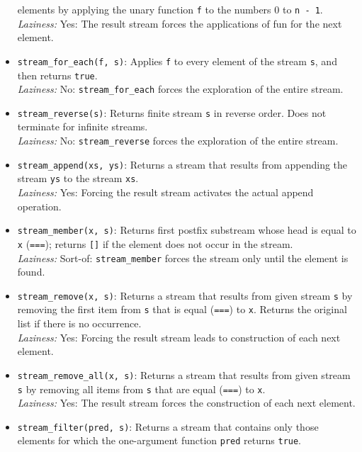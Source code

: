 \begin{itemize}
elements by applying the unary function \lstinline{f} to the numbers 0
to \lstinline{n - 1}.\\
\emph{Laziness:}  Yes: The result stream forces the applications of fun
            for the next element.
\item \lstinline{stream_for_each(f, s)}: Applies \lstinline{f} to every
  element of the stream \lstinline{s}, and then returns
  \lstinline{true}.\\
\emph{Laziness:}  No: \lstinline{stream_for_each} forces the exploration of the entire stream.
\item \lstinline{stream_reverse(s)}: Returns finite stream \lstinline{s} in reverse
  order. Does not terminate for infinite streams.\\
\emph{Laziness:}  No: \lstinline{stream_reverse} forces the exploration of the entire stream.
\item \lstinline{stream_append(xs, ys)}: Returns a stream that results from 
appending the stream \lstinline{ys} to the stream \lstinline{xs}.\\
\emph{Laziness:}  Yes: Forcing the result stream activates the actual append operation.
\item \lstinline{stream_member(x, s)}: Returns first postfix substream
whose head is equal to
\lstinline{x} (\lstinline{===}); returns \lstinline{[]} if the
element does not occur in the stream.\\
 \emph{Laziness:}  Sort-of: \lstinline{stream_member} forces the stream only until the element is found.
\item \lstinline{stream_remove(x, s)}: Returns a stream that results from
given stream \lstinline{s} by removing the first item from \lstinline{s} that
is equal (\lstinline{===}) to \lstinline{x}.
Returns the original list
if there is no occurrence.\\
\emph{Laziness:}  Yes: Forcing the result stream leads to construction of each next element.
\item \lstinline{stream_remove_all(x, s)}: Returns a stream that results from
given stream \lstinline{s} by removing all items from \lstinline{s} that
are equal (\lstinline{===}) to \lstinline{x}.\\
\emph{Laziness:}  Yes: The result stream forces the construction of each next element.
\item \lstinline{stream_filter(pred, s)}: Returns a stream that contains
only those elements for which the one-argument function
\lstinline{pred}
returns \lstinline{true}.\\

\end{itemize}
